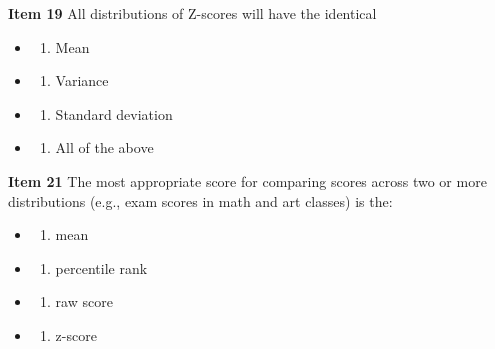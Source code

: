 \documentclass[
  english,
]{book}
\providecommand{\tightlist}{%
  \setlength{\itemsep}{0pt}\setlength{\parskip}{0pt}}
\begin{document}
\textbf{Item 19} All distributions of Z-scores will have the identical

\begin{itemize}
\item
  \begin{enumerate}
  \def\labelenumi{\alph{enumi})}
  \tightlist
  \item
    Mean
  \end{enumerate}
\item
  \begin{enumerate}
  \def\labelenumi{\alph{enumi})}
  \setcounter{enumi}{1}
  \tightlist
  \item
    Variance
  \end{enumerate}
\item
  \begin{enumerate}
  \def\labelenumi{\alph{enumi})}
  \setcounter{enumi}{2}
  \tightlist
  \item
    Standard deviation
  \end{enumerate}
\item
  \begin{enumerate}
  \def\labelenumi{\alph{enumi})}
  \setcounter{enumi}{3}
  \tightlist
  \item
    All of the above
  \end{enumerate}
\end{itemize}

\textbf{Item 21} The most appropriate score for comparing scores across two or more distributions (e.g., exam scores in math and art classes) is the:

\begin{itemize}
\item
  \begin{enumerate}
  \def\labelenumi{\alph{enumi})}
  \tightlist
  \item
    mean
  \end{enumerate}
\item
  \begin{enumerate}
  \def\labelenumi{\alph{enumi})}
  \setcounter{enumi}{1}
  \tightlist
  \item
    percentile rank
  \end{enumerate}
\item
  \begin{enumerate}
  \def\labelenumi{\alph{enumi})}
  \setcounter{enumi}{2}
  \tightlist
  \item
    raw score
  \end{enumerate}
\item
  \begin{enumerate}
  \def\labelenumi{\alph{enumi})}
  \setcounter{enumi}{3}
  \tightlist
  \item
    z-score
  \end{enumerate}
\end{itemize}
\end{document}
